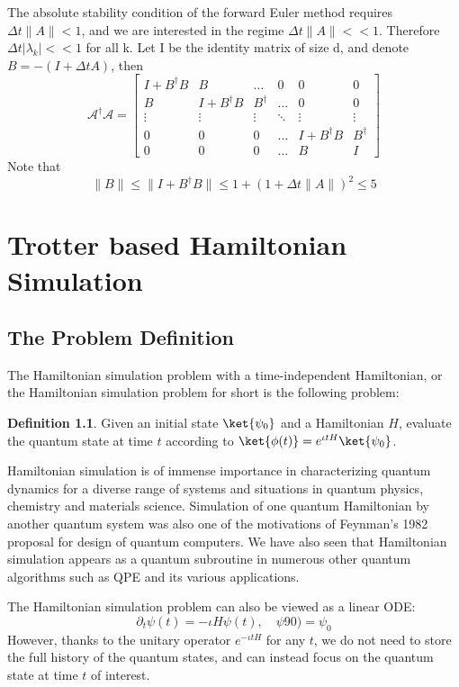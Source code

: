 \documentclass[12pt, oneside]{book}
\theoremstyle{definition}
\newtheorem{definition}{Definition}[section]
\theoremstyle{definition}
\theoremstyle{remark}
\begin{document}
The absolute stability condition of the forward Euler method requires $\Delta t\|A\|<1$, and we are interested in the regime $\Delta t\|A\|<<1$. Therefore $\Delta t|\lambda_k|<<1$ for all k. Let I be the identity matrix of size d, and denote $B=-(I+\Delta tA)$, then
\[
\mathcal{A}^{\dagger}\mathcal{A}=\begin{bmatrix} I + B^{\dagger}B & B & \ldots & 0 & 0 & 0 \\ B & I + B^{\dagger}B & B^{\dagger} & \ldots & 0 & 0 \\
\vdots & \vdots & \vdots & \ddots &\vdots & \vdots  \\
0 & 0 & 0 & \ldots & I+B^{\dagger}B & B^{\dagger} \\
0 & 0 & 0 & \ldots & B & I \end{bmatrix}
\]
Note that
\[
\|B\|\leq \|I+B^{\dagger}B\|\leq 1+(1+\Delta t\|A\|)^2\leq 5
\]
\chapter{Trotter based Hamiltonian Simulation}
\section{The Problem Definition}
The Hamiltonian simulation problem with a time-independent Hamiltonian, or the Hamiltonian simulation problem for short is the following problem: 
\begin{definition}Given an initial state $\ket{\psi_0}$ and a Hamiltonian $H$, evaluate the quantum state at time $t$ according to $\ket{\phi(t)}=e^{\iota t H}\ket{\psi_0}$. 
\end{definition}
Hamiltonian simulation is of immense importance in characterizing quantum dynamics for a diverse range of systems and situations in quantum physics, chemistry and materials science. Simulation of one quantum Hamiltonian by another quantum system was also one of the motivations of Feynman's 1982 proposal for design of quantum computers. We have also seen that Hamiltonian simulation appears as a quantum subroutine in numerous other quantum algorithms such as QPE and its various applications.

The Hamiltonian simulation problem can also be viewed as a linear ODE:
\[
\partial_t\psi(t)=-\iota H\psi(t), \quad \psi90)=\psi_0
\]
However, thanks to the unitary operator $e^{-\iota t H}$ for any $t$, we do not need to store the full history of the quantum states, and can instead focus on the quantum state at time $t$ of interest.
\end{document}
